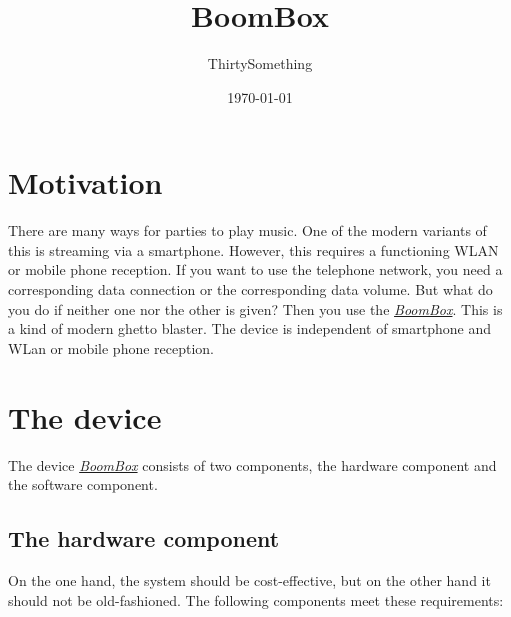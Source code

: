 \documentclass[12pt,a4paper]{article}
\author{ThirtySomething}
\title{BoomBox}
\date{\today}
\newcommand{\bb}{\textit{\href{https://github.com/ThirtySomething/BoomBox}{BoomBox}}}
\begin{document}
\clearpage\maketitle
\thispagestyle{empty}
\newpage

\tableofcontents
{}
\newpage

\section{Motivation}
There are many ways for parties to play music. One of the modern variants of this is streaming via a smartphone. However, this requires a functioning WLAN or
mobile phone reception. If you want to use the telephone network, you need a corresponding data connection or the corresponding data volume. But what do you do
if neither one nor the other is given? Then you use the \bb{}. This is a kind of modern ghetto blaster. The device is independent of smartphone and WLan or
mobile phone reception.

\section{The device}
The device \bb{} consists of two components, the hardware component and the software component.

\subsection{The hardware component}
On the one hand, the system should be cost-effective, but on the other hand it should not be old-fashioned. The following components meet these requirements:
\end{document}
